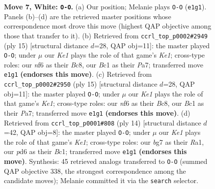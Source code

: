 \documentclass[11pt]{article}
\begin{document}
\begin{figure}[p]
\caption{\textbf{Move 7, White: \texttt{O-O}.} (a) Our position; Melanie plays \texttt{O-O} (\texttt{e1g1}). Panels (b)--(d) are the retrieved master positions whose correspondence most drove this move (highest QAP objective among those that transfer to it). (b) Retrieved from \texttt{ccrl\_top\_p0002\#2949} (ply 15) [structural distance $d$=28, QAP obj=11]: the master played \texttt{O-O}; under $\mu$ our \emph{Ke1} plays the role of that game's \emph{Ke1}; cross-type roles: our \emph{n}f6 as their \emph{B}c8, our \emph{B}c1 as their \emph{P}a7; transferred move \texttt{e1g1} \textbf{(endorses this move)}. (c) Retrieved from \texttt{ccrl\_top\_p0002\#2950} (ply 15) [structural distance $d$=28, QAP obj=11]: the master played \texttt{O-O}; under $\mu$ our \emph{Ke1} plays the role of that game's \emph{Ke1}; cross-type roles: our \emph{n}f6 as their \emph{B}c8, our \emph{B}c1 as their \emph{P}a7; transferred move \texttt{e1g1} \textbf{(endorses this move)}. (d) Retrieved from \texttt{ccrl\_top\_p0001\#808} (ply 14) [structural distance $d$=42, QAP obj=8]: the master played \texttt{O-O}; under $\mu$ our \emph{Ke1} plays the role of that game's \emph{Ke1}; cross-type roles: our \emph{b}g7 as their \emph{R}a1, our \emph{p}d6 as their \emph{B}c1; transferred move \texttt{e1g1} \textbf{(endorses this move)}. Synthesis: 45 retrieved analogs transferred to \texttt{O-O} (summed QAP objective 338, the strongest correspondence among the candidate moves); Melanie committed it via the \texttt{search} selector.}
\label{fig:thought-m12}
\end{figure}

\clearpage
\end{document}
